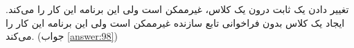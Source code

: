 \section{}
\paragraph{}\label{hint:300}
تغییر دادن یک ثابت درون یک کلاس، غیرممکن است ولی این برنامه این کار را می‌کند. ایجاد یک کلاس بدون فراخوانی تابع سازنده غیرممکن است ولی این برنامه این کار را می‌کند. (جواب \ref{answer:98})
